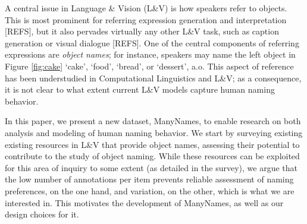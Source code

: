

A central issue in Language \& Vision (L\&V) is how speakers refer to objects. 
This is most prominent for referring expression generation and interpretation [REFS], but it also pervades virtually any other L\&V task, such as caption generation or visual dialogue [REFS].
One of the central components of referring expressions are \textit{object names}; for instance, speakers may name the left object in Figure \ref{fig:cake} `cake', `food', `bread', or `dessert', a.o.
This aspect of reference has been understudied in Computational Linguistics and L\&V; as a consequence, it is not clear to what extent current L\&V models capture human naming behavior.

In this paper, we present a new dataset, ManyNames, to enable research on both analysis and modeling of human naming behavior. 
We start by surveying existing existing resources in L\&V that provide object names,
assessing their potential to contribute to the study of object naming.
While these resources can be exploited for this area of inquiry to some extent (as detailed in the survey), we argue that the low number of annotations per item prevents reliable assessment of naming preferences, on the one hand, and variation, on the other, which is what we are interested in. 
This motivates the development of ManyNames, as well as our design choices for it. 

